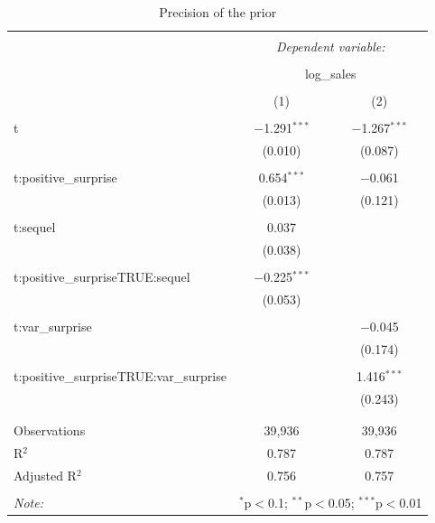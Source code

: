 \begin{table}[!htbp] \centering 
	\caption{Precision of the prior} 
	\label{} 
	\begin{tabular}{@{\extracolsep{5pt}}lcc} 
		\\[-1.8ex]\hline 
		\hline \\[-1.8ex] 
		& \multicolumn{2}{c}{\textit{Dependent variable:}} \\ 
		\cline{2-3} 
		\\[-1.8ex] & \multicolumn{2}{c}{log\_sales} \\ 
		\\[-1.8ex] & (1) & (2)\\ 
		\hline \\[-1.8ex] 
		t & $-$1.291$^{***}$ & $-$1.267$^{***}$ \\ 
		& (0.010) & (0.087) \\ 
		& & \\ 
		t:positive\_surprise & 0.654$^{***}$ & $-$0.061 \\ 
		& (0.013) & (0.121) \\ 
		& & \\ 
		t:sequel & 0.037 &  \\ 
		& (0.038) &  \\ 
		& & \\ 
		t:positive\_surpriseTRUE:sequel & $-$0.225$^{***}$ &  \\ 
		& (0.053) &  \\ 
		& & \\ 
		t:var\_surprise &  & $-$0.045 \\ 
		&  & (0.174) \\ 
		& & \\ 
		t:positive\_surpriseTRUE:var\_surprise &  & 1.416$^{***}$ \\ 
		&  & (0.243) \\ 
		& & \\ 
		\hline \\[-1.8ex] 
		Observations & 39,936 & 39,936 \\ 
		R$^{2}$ & 0.787 & 0.787 \\ 
		Adjusted R$^{2}$ & 0.756 & 0.757 \\ 
		\hline 
		\hline \\[-1.8ex] 
		\textit{Note:}  & \multicolumn{2}{r}{$^{*}$p$<$0.1; $^{**}$p$<$0.05; $^{***}$p$<$0.01} \\ 
	\end{tabular} 
\end{table} 

